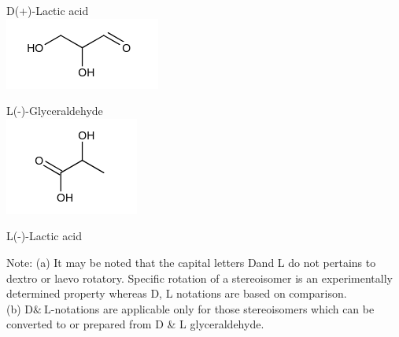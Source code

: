\documentclass[10pt]{article}
\begin{document}
D(+)-Lactic acid\\
\includegraphics{smile-35351c0dd38051c2e6ad1c00274a9430286a31ea}

L(-)-Glyceraldehyde\\
\includegraphics{smile-7a1258c6e24d5ce8923d056fd0b09fc95d1cbf0e}

L(-)-Lactic acid

Note: (a) It may be noted that the capital letters Dand L do not pertains to dextro or laevo rotatory. Specific rotation of a stereoisomer is an experimentally determined property whereas D, L notations are based on comparison.\\
(b) $\mathrm{D} \& \mathrm{~L}$-notations are applicable only for those stereoisomers which can be converted to or prepared from D \& L glyceraldehyde.
\end{document}
